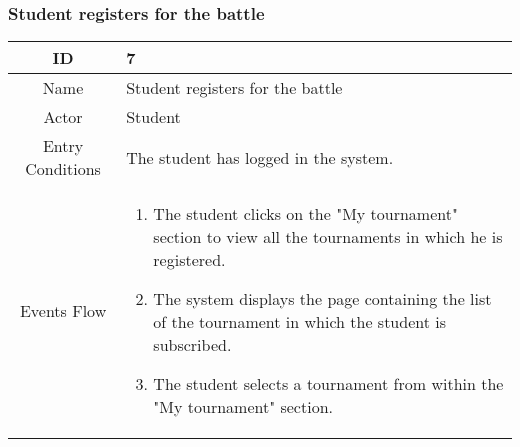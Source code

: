
\newpage
\subsubsection{Student registers for the battle}
\begin{longtable}{|c| p{10cm}|}
        \hline
            ID & 7 \\
        \hline
            Name & Student registers for the battle  \\
        \hline
            Actor & Student \\
        \hline
            Entry Conditions & 
                                    The student  has logged in the system.
\\
        \hline
            Events Flow &   \begin{enumerate}
                
                                \item The student clicks on the "My tournament" section to view all the tournaments in which he is registered.
                                \item The system displays the page containing the list of the tournament in which the student is subscribed.
                                \item The student selects a tournament from within the "My tournament" section.


\end{enumerate}
\end{longtable}
